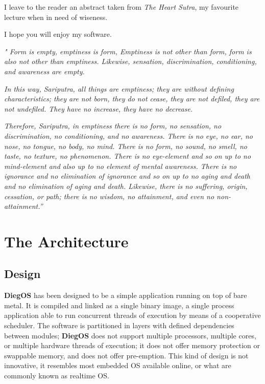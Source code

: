 \documentclass[11pt,b5paper]{scrbook}
\newcommand{\myOS}{{\color{SteelBlue}\textbf{DiegOS}}}
\begin{document}
I leave to the reader an abstract taken from \textit{The Heart Sutra}, my favourite lecture when in need of wiseness.

I hope you will enjoy my software.

\emph{" Form is empty, emptiness is form, Emptiness is not other than form, form is also not other than emptiness.
Likewise, sensation, discrimination, conditioning, and awareness are empty.}

\emph{In this way, Sariputra, all things are emptiness; they are without defining characteristics;
they are not born, they do not cease, they are not defiled, they are not undefiled.
They have no increase, they have no decrease.}

\emph{Therefore, Sariputra, in emptiness there is no form, no sensation, no discrimination, no conditioning, and no awareness.
There is no eye, no ear, no nose, no tongue, no body, no mind.
There is no form, no sound, no smell, no taste, no texture, no phenomenon.
There is no eye-element and so on up to no mind-element and also up to no element of mental awareness.
There is no ignorance and no elimination of ignorance and so on up to no aging and death and no elimination of aging and death.
Likewise, there is no suffering, origin, cessation, or path; there is no wisdom, no attainment, and even no non-attainment.''}
\vfill

\chapter{The Architecture}
\newpage
\section{Design}
{\myOS} has been designed to be a simple application running on top of bare metal.
It is compiled and linked as a single binary image, a single process application able to run 
concurrent threads of execution by means of a cooperative scheduler.
The software is partitioned in layers with defined dependencies between modules;
{\myOS} does not support multiple processors,  multiple cores, or multiple hardware 
threads of execution; it does not offer memory protection or swappable memory,
and does not offer pre-emption.
This kind of design is not innovative, it resembles most embedded OS available
online, or what are commonly known as realtime OS.
\end{document}
